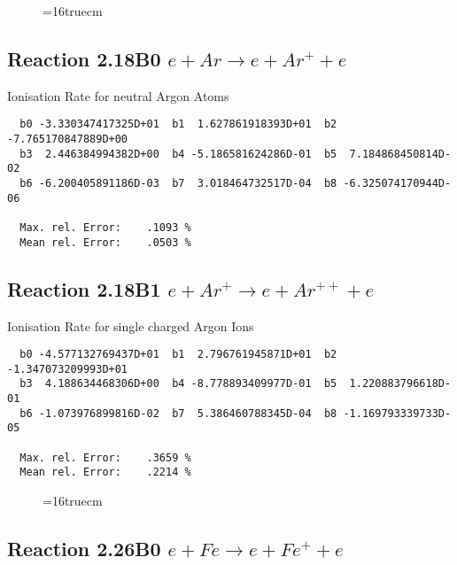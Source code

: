 \documentclass[12pt]{article}
\begin{document}
\begin{figure} \label{2.10B0}
\epsfxsize=16truecm
\end{figure}

\newpage

\subsection{
Reaction 2.18B0   $e + Ar  \rightarrow e + Ar^+  + e$
}

  Ionisation Rate for neutral Argon Atoms

\begin{small}\begin{verbatim}
  b0 -3.330347417325D+01  b1  1.627861918393D+01  b2 -7.765170847889D+00
  b3  2.446384994382D+00  b4 -5.186581624286D-01  b5  7.184868450814D-02
  b6 -6.200405891186D-03  b7  3.018464732517D-04  b8 -6.325074170944D-06

  Max. rel. Error:    .1093 %
  Mean rel. Error:    .0503 %

\end{verbatim}\end{small}



\subsection{
Reaction 2.18B1   $e + Ar^+ \rightarrow e + Ar^{++} + e$
}

  Ionisation Rate for single charged Argon Ions

\begin{small}\begin{verbatim}
  b0 -4.577132769437D+01  b1  2.796761945871D+01  b2 -1.347073209993D+01
  b3  4.188634468306D+00  b4 -8.778893409977D-01  b5  1.220883796618D-01
  b6 -1.073976899816D-02  b7  5.386460788345D-04  b8 -1.169793339733D-05

  Max. rel. Error:    .3659 %
  Mean rel. Error:    .2214 %

\end{verbatim}\end{small}


\begin{figure} \label{2.18B}
\epsfxsize=16truecm
\end{figure}
\newpage



\subsection{
Reaction 2.26B0   $e + Fe  \rightarrow e + Fe^+  + e$
}
\end{document}
